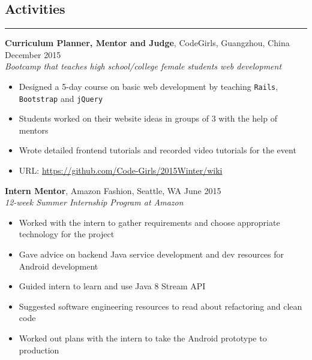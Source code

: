 \documentclass[line]{res} %
\begin{document}
\begin{resume}
  \section{Activities}
  \rule{\textwidth}{1pt}
    \textbf{Curriculum Planner, Mentor and Judge}, CodeGirls, Guangzhou, China
    \hfill December 2015 \\
    \textit{Bootcamp that teaches high school/college female students web development}
    \begin{itemize} \itemsep -2pt  %
      \item Designed a 5-day course on basic web development by teaching \texttt{Rails},
      \texttt{Bootstrap} and \texttt{jQuery}
      \item Students worked on their website ideas in groups of 3 with the help of mentors
      \item Wrote detailed frontend tutorials and recorded video tutorials for the event
      \item URL: \underline{https://github.com/Code-Girls/2015Winter/wiki}
    \end{itemize}

    \textbf{Intern Mentor}, Amazon Fashion, Seattle, WA
    \hfill June 2015 \\
    \textit{12-week Summer Internship Program at Amazon}
    \begin{itemize} \itemsep -2pt  %
      \item Worked with the intern to gather requirements and choose appropriate
            technology for the project
      \item Gave advice on backend Java service development and dev resources
            for Android development
      \item Guided intern to learn and use Java 8 Stream API
      \item Suggested software engineering resources to read about refactoring and clean code
      \item Worked out plans with the intern to take the Android prototype to production
    \end{itemize}


\end{resume}
\end{document}
